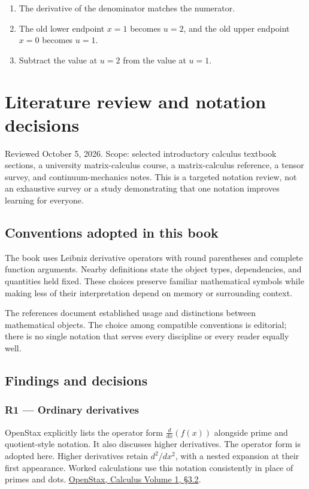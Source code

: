 \documentclass[11pt,oneside,openany]{book}
\begin{document}
\begin{enumerate}
\item The derivative of the denominator matches the numerator.
\item The old lower endpoint \(x=1\) becomes \(u=2\), and the old upper endpoint \(x=0\) becomes \(u=1\).
\item Subtract the value at \(u=2\) from the value at \(u=1\).
\end{enumerate}

\chapter{Literature review and notation decisions}
\markright{}

Reviewed October 5, 2026. Scope: selected introductory calculus textbook sections, a university matrix-calculus course, a matrix-calculus reference, a tensor survey, and continuum-mechanics notes. This is a targeted notation review, not an exhaustive survey or a study demonstrating that one notation improves learning for everyone.

\section{Conventions adopted in this book}

The book uses Leibniz derivative operators with round parentheses and complete
function arguments. Nearby definitions state the object types, dependencies, and
quantities held fixed. These choices preserve familiar mathematical symbols while
making less of their interpretation depend on memory or surrounding context.

The references document established usage and distinctions between mathematical
objects. The choice among compatible conventions is editorial; there is no single
notation that serves every discipline or every reader equally well.

\section{Findings and decisions}

\subsection{R1 --- Ordinary derivatives}

OpenStax explicitly lists the operator form \(\frac{d}{dx}\left(f(x)\right)\) alongside prime and quotient-style notation. It also discusses higher derivatives. The operator form is adopted here. Higher derivatives retain \(d^2/dx^2\), with a nested expansion at their first appearance. Worked calculations use this notation consistently in place of primes and dots. \href{https://openstax.org/books/calculus-volume-1/pages/3-2-the-derivative-as-a-function}{OpenStax, Calculus Volume 1, §3.2}.
\end{document}
